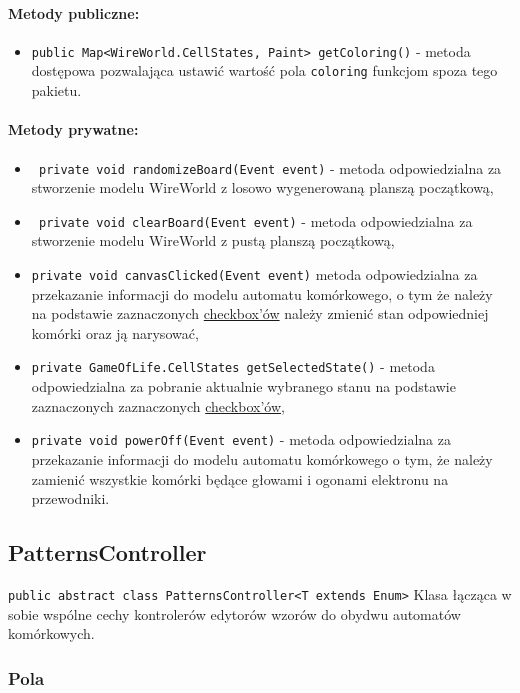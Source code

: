 \documentclass{report}
\begin{document}
\paragraph{Metody publiczne:}
\begin{itemize}
 	\item \texttt{public Map<WireWorld.CellStates, Paint> getColoring()} - metoda dostępowa pozwalająca ustawić wartość pola \texttt{coloring} funkcjom spoza tego pakietu.
\end{itemize}
\paragraph{Metody prywatne:}
\begin{itemize}
 	\item \texttt{ private void randomizeBoard(Event event)} - metoda odpowiedzialna za stworzenie modelu WireWorld z losowo wygenerowaną planszą początkową,
 	\item \texttt{ private void clearBoard(Event event)} - metoda odpowiedzialna za stworzenie modelu WireWorld z pustą planszą początkową,
 	\item \texttt{private void canvasClicked(Event event)} metoda odpowiedzialna za przekazanie informacji do modelu automatu komórkowego, o tym że należy na podstawie zaznaczonych \hyperref[sec:checkbox]{checkbox'ów} należy zmienić stan odpowiedniej komórki oraz ją narysować,
 	\item \texttt{private GameOfLife.CellStates getSelectedState()} - metoda odpowiedzialna za pobranie aktualnie wybranego stanu na podstawie zaznaczonych  zaznaczonych \hyperref[sec:checkbox]{checkbox'ów},
 	\item \texttt{private void powerOff(Event event)} - metoda odpowiedzialna za przekazanie informacji do modelu automatu komórkowego o tym, że należy zamienić wszystkie komórki będące głowami i ogonami elektronu na przewodniki.
\end{itemize}
\subsection{PatternsController}
\texttt{public abstract class PatternsController<T extends Enum>}
Klasa łącząca w sobie wspólne cechy kontrolerów edytorów wzorów do obydwu automatów komórkowych.
\subsubsection{Pola}
\end{document}
